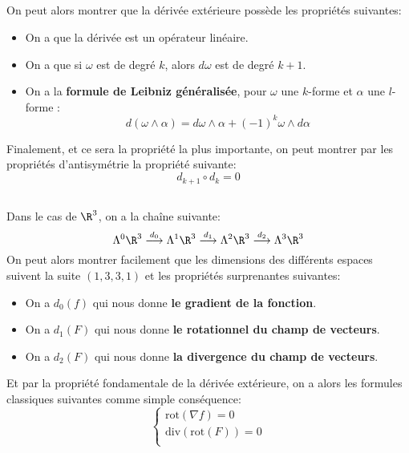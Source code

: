 \documentclass{report}
\begin{document}
   \subsection*{}
   On peut alors montrer que la dérivée extérieure possède les propriétés suivantes:
   \begin{itemize}
      \item On a que la dérivée est un opérateur linéaire.
      \item On a que si \(\omega\) est de degré \(k\), alors \(d\omega\) est de degré \(k+1\).
      \item On a la \textbf{formule de Leibniz généralisée}, pour \(\omega\) une \(k\)-forme et \(\alpha\) une \(l\)-forme : \[d(\omega \wedge \alpha) = d\omega \wedge \alpha + (-1)^k\omega \wedge d\alpha\]
   \end{itemize}
   \pagebreak

   Finalement, et ce sera la propriété la plus importante, on peut montrer par les propriétés d'antisymétrie la propriété suivante:
   \[
      d_{k+1} \circ d_k = 0
   \]

   \subsection*{}
   Dans le cas de \(\R^3\), on a la chaîne suivante:
   \[
      \Lambda^0 \R^3 \overset{d_0}{\longrightarrow} \Lambda^1 \R^3 \overset{d_1}{\longrightarrow} \Lambda^2 \R^3 \overset{d_2}{\longrightarrow} \Lambda^3 \R^3
   \]
   On peut alors montrer facilement que les dimensions des différents espaces suivent la suite \((1, 3, 3, 1)\) et les propriétés surprenantes suivantes:
   \begin{itemize}
      \item On a \(d_0(f)\) qui nous donne \textbf{le gradient de la fonction}.
      \item On a \(d_1(F)\) qui nous donne \textbf{le rotationnel du champ de vecteurs}.
      \item On a \(d_2(F)\) qui nous donne \textbf{la divergence du champ de vecteurs}.
   \end{itemize}
   Et par la propriété fondamentale de la dérivée extérieure, on a alors les formules classiques suivantes comme simple conséquence:
   \[
      \begin{cases}
         \text{rot}(\nabla f) = 0\\
         \text{div}(\text{rot}(F)) = 0\\
      \end{cases}
   \]
\end{document}
